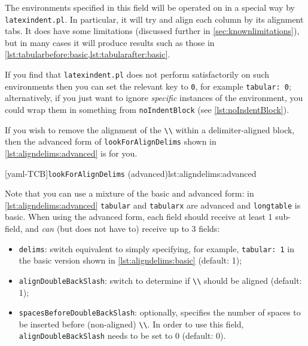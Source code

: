 \documentclass[10pt]{article}
\begin{document}
The environments specified in this field will be operated on in a special way  by \texttt{latexindent.pl}. In particular, it will try and align each column by its alignment
tabs. It does have some limitations (discussed further in \cref{sec:knownlimitations}),
but in many cases it will produce results such as those in \cref{lst:tabularbefore:basic,lst:tabularafter:basic}.

If you find that \texttt{latexindent.pl} does not perform satisfactorily on such
environments then you can set the relevant key to \texttt{0}, for example \texttt{tabular: 0}; alternatively, if you just want to ignore \emph{specific}
instances of the environment, you could wrap them in something from \texttt{noIndentBlock} (see \cref{lst:noIndentBlock}).

\begin{minipage}{.45\textwidth}
\end{minipage}%
\hfill
\begin{minipage}{.45\textwidth}
\end{minipage}%

If you wish to remove the alignment of the \lstinline!\\! within a delimiter-aligned block, then the
advanced form of \texttt{lookForAlignDelims} shown in \cref{lst:aligndelims:advanced} is for you.

[yaml-TCB]{\texttt{lookForAlignDelims} (advanced)}{lst:aligndelims:advanced}

Note that you can use a mixture of the basic and advanced form: in \cref{lst:aligndelims:advanced} \texttt{tabular} and \texttt{tabularx}
are advanced and \texttt{longtable} is basic. When using the advanced form, each field should receive at least 1 sub-field, and \emph{can} (but does not have to) receive up to 3 fields:
\begin{itemize}
	\item \texttt{delims}: switch equivalent to simply specifying, for example, \texttt{tabular: 1} in
	      the basic version shown in \cref{lst:aligndelims:basic} (default: 1);
	\item \texttt{alignDoubleBackSlash}: switch to determine if \lstinline!\\! should be aligned (default: 1);
	\item \texttt{spacesBeforeDoubleBackSlash}: optionally, specifies the number of spaces to be inserted
	      before (non-aligned) \lstinline!\\!. In order to use this field, \texttt{alignDoubleBackSlash} needs
	      to be set to 0 (default: 0).
\end{itemize}
\end{document}
